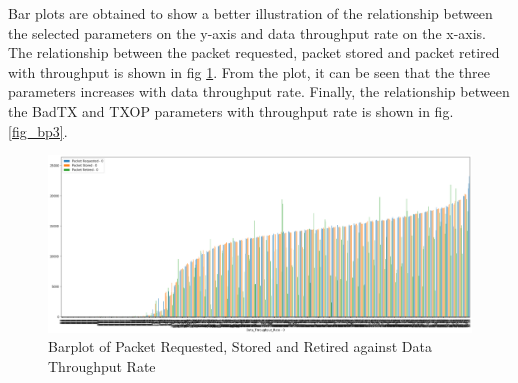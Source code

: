 Bar plots are obtained to show a better illustration of the relationship between the selected parameters on the y-axis and data throughput rate on the x-axis. The relationship between the packet requested, packet stored and packet retired with throughput is shown in fig \ref{fig_bp1}. From the plot, it can be seen that the three parameters increases with data throughput rate.
Finally, the relationship between the BadTX and TXOP parameters with throughput rate is shown in fig. \ref{fig_bp3}.
\begin{figure} [ht]
    \centering
    \includegraphics[scale = 0.52]{pages/Chapter4/Chapter 4 Images/Bplot1.PNG}
    \caption{Barplot of Packet Requested, Stored and Retired against Data Throughput Rate}
    \label{fig_bp1}
\end{figure}

